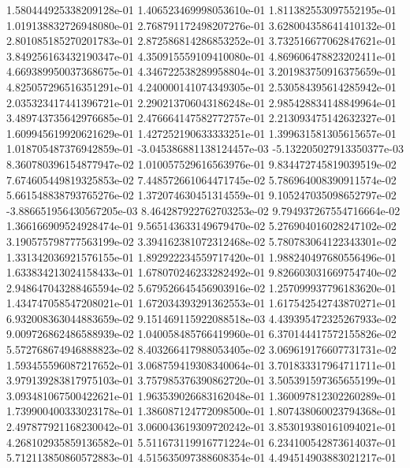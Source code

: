 1.580444925338209128e-01	1.406523469998053610e-01	1.811382553097552195e-01	1.019138832726948080e-01	2.768791172498207276e-01	3.628004358641410132e-01	2.801085185270201783e-01	2.872586814286853252e-01	3.732516677062847621e-01	3.849256163432190347e-01	4.350915559109410080e-01	4.869606478823202411e-01	4.669389950037368675e-01	4.346722538289958804e-01	3.201983750916375659e-01	4.825057296516351291e-01	4.240000141074349305e-01	2.530584395614285942e-01	2.035323417441396721e-01	2.290213706043186248e-01	2.985428834148849964e-01	3.489743735642976685e-01	2.476664147582772757e-01	2.213093475142632327e-01	1.609945619920621629e-01	1.427252190633333251e-01	1.399631581305615657e-01	1.018705487376942859e-01	-3.045386881138124457e-03	-5.132205027913350377e-03	8.360780396154877947e-02	1.010057529616563976e-01	9.834472745819039519e-02	7.674605449819325853e-02	7.448572661064471745e-02	5.786964008390911574e-02	5.661548838793765276e-02	1.372074630451314559e-01	9.105247035098652797e-02	-3.886651956430567205e-03	8.464287922762703253e-02	9.794937267554716664e-02	1.366166909524928474e-01	9.565143633149679470e-02	5.276904016028247102e-02	3.190575798777563199e-02	3.394162381072312468e-02	5.780783064122343301e-02	1.331342036921576155e-01	1.892922234559717420e-01	1.988240497680556496e-01	1.633834213024158433e-01	1.678070246233282492e-01	9.826603031669754740e-02	2.948647043288465594e-02	5.679526645456903916e-02	1.257099937796183620e-01	1.434747058547208021e-01	1.672034393291362553e-01	1.617542542743870271e-01	6.932008363044883659e-02	9.151469115922088518e-03	4.439395472325267933e-02	9.009726862486588939e-02	1.040058485766419960e-01	6.370144417572155826e-02	5.572768674946888823e-02	8.403266417988053405e-02	3.069619176607731731e-02	1.593455596087217652e-01	3.068759419308340064e-01	3.701833317964711711e-01	3.979139283817975103e-01	3.757985376390862720e-01	3.505391597365655199e-01	3.093481067500422621e-01	1.963539026683162048e-01	1.360097812302260289e-01	1.739900400333023178e-01	1.386087124772098500e-01	1.807438060023794368e-01	2.497877921168230042e-01	3.060043619309720242e-01	3.853019380161094021e-01	4.268102935859136582e-01	5.511673119916771224e-01	6.234100542873614037e-01	5.712113850860572883e-01	4.515635097388608354e-01	4.494514903883021217e-01
